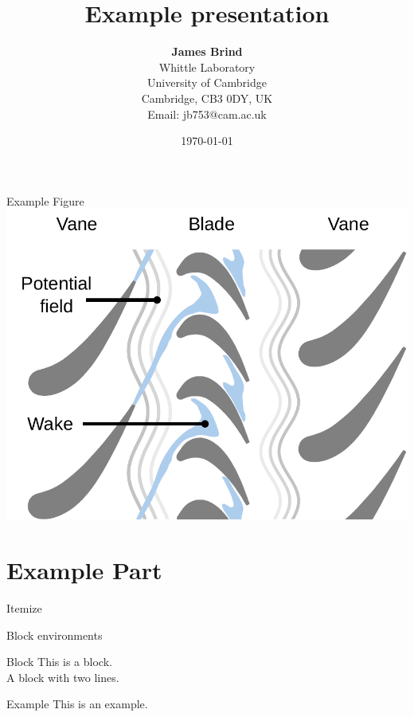\documentclass{beamer}
\title{Example presentation}
\author{\texorpdfstring{\textbf{James Brind}}{James Brind} \\ 
Whittle Laboratory \\
University of Cambridge \\
Cambridge, CB3 0DY, UK \\
Email: jb753@cam.ac.uk}
\date{\today}
\begin{document}
%
%
\begin{frame}
  \titlepage
\end{frame}

%
%
\begin{frame}{Example Figure}
  \centering
  \includegraphics[width=0.9\linewidth,trim={0 1.5cm 0 0},clip]{figures/blade_row_interactions.pdf}
\end{frame}

\part{Example Part}
\frame{\partpage}

\begin{frame}{Itemize}
\end{frame}

\begin{frame}{Block environments}
  \begin{block}{Block}
    This is a block.\\
    A block with two lines.
  \end{block}
  \begin{exampleblock}{Example}
    This is an example.
  \end{exampleblock}

\end{frame}
\end{document}
